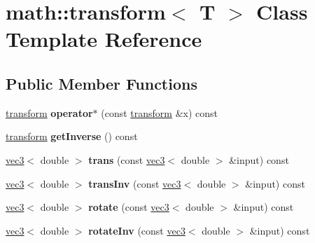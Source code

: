 \hypertarget{classmath_1_1transform}{
\section{math::transform$<$ T $>$ Class Template Reference}
\label{classmath_1_1transform}
}
\subsection*{Public Member Functions}
\begin{DoxyCompactItemize}
\item 
\hypertarget{classmath_1_1transform_ac9ae83b2a4856b0763d6e845c2cd60a0}{
\hyperlink{classmath_1_1transform}{transform} {\bfseries operator$\ast$} (const \hyperlink{classmath_1_1transform}{transform} \&x) const }
\label{classmath_1_1transform_ac9ae83b2a4856b0763d6e845c2cd60a0}

\item 
\hypertarget{classmath_1_1transform_a64e208d96af2e40311962c718d06a253}{
\hyperlink{classmath_1_1transform}{transform} {\bfseries getInverse} () const }
\label{classmath_1_1transform_a64e208d96af2e40311962c718d06a253}

\item 
\hypertarget{classmath_1_1transform_a4ed85416967cc655ab18db6049cd0c9a}{
\hyperlink{classmath_1_1vec3}{vec3}$<$ double $>$ {\bfseries trans} (const \hyperlink{classmath_1_1vec3}{vec3}$<$ double $>$ \&input) const }
\label{classmath_1_1transform_a4ed85416967cc655ab18db6049cd0c9a}

\item 
\hypertarget{classmath_1_1transform_a783e2f24598656c2e696c4dab8a1b6b9}{
\hyperlink{classmath_1_1vec3}{vec3}$<$ double $>$ {\bfseries transInv} (const \hyperlink{classmath_1_1vec3}{vec3}$<$ double $>$ \&input) const }
\label{classmath_1_1transform_a783e2f24598656c2e696c4dab8a1b6b9}

\item 
\hypertarget{classmath_1_1transform_ae1dc64bee8360e3c8cf52989555da8af}{
\hyperlink{classmath_1_1vec3}{vec3}$<$ double $>$ {\bfseries rotate} (const \hyperlink{classmath_1_1vec3}{vec3}$<$ double $>$ \&input) const }
\label{classmath_1_1transform_ae1dc64bee8360e3c8cf52989555da8af}

\item 
\hypertarget{classmath_1_1transform_a845be40f034a7d35d0ab6298f734bea5}{
\hyperlink{classmath_1_1vec3}{vec3}$<$ double $>$ {\bfseries rotateInv} (const \hyperlink{classmath_1_1vec3}{vec3}$<$ double $>$ \&input) const }
\label{classmath_1_1transform_a845be40f034a7d35d0ab6298f734bea5}


\end{DoxyCompactItemize}
